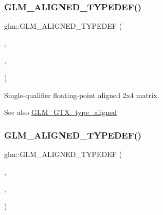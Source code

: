 \subsubsection{\texorpdfstring{G\+L\+M\+\_\+\+A\+L\+I\+G\+N\+E\+D\+\_\+\+T\+Y\+P\+E\+D\+E\+F()}{GLM\_ALIGNED\_TYPEDEF()}\hspace{0.1cm}{\footnotesize\ttfamily [174/209]}}
{\footnotesize\ttfamily glm\+::\+G\+L\+M\+\_\+\+A\+L\+I\+G\+N\+E\+D\+\_\+\+T\+Y\+P\+E\+D\+EF (\begin{DoxyParamCaption}\item[{\mbox{\hyperlink{group__gtc__type__precision_gabaf7537f5284456254b1da1cd6fd2b78}{fmat2x4}}}]{,  }\item[{aligned\+\_\+fmat2x4}]{,  }\item[{16}]{ }\end{DoxyParamCaption})}

Single-\/qualifier floating-\/point aligned 2x4 matrix. \begin{DoxySeeAlso}{See also}
\mbox{\hyperlink{group__gtx__type__aligned}{G\+L\+M\+\_\+\+G\+T\+X\+\_\+type\+\_\+aligned}} 
\end{DoxySeeAlso}
\mbox{\label{group__gtx__type__aligned_ga4b4e181cd041ba28c3163e7b8074aef0}} 
\subsubsection{\texorpdfstring{G\+L\+M\+\_\+\+A\+L\+I\+G\+N\+E\+D\+\_\+\+T\+Y\+P\+E\+D\+E\+F()}{GLM\_ALIGNED\_TYPEDEF()}\hspace{0.1cm}{\footnotesize\ttfamily [175/209]}}
{\footnotesize\ttfamily glm\+::\+G\+L\+M\+\_\+\+A\+L\+I\+G\+N\+E\+D\+\_\+\+T\+Y\+P\+E\+D\+EF (\begin{DoxyParamCaption}\item[{\mbox{\hyperlink{group__gtc__type__precision_gaed9c8fe9d2e094bf3bc7c606bbae1a6b}{fmat3x2}}}]{,  }\item[{aligned\+\_\+fmat3x2}]{,  }\item[{16}]{ }\end{DoxyParamCaption})}


